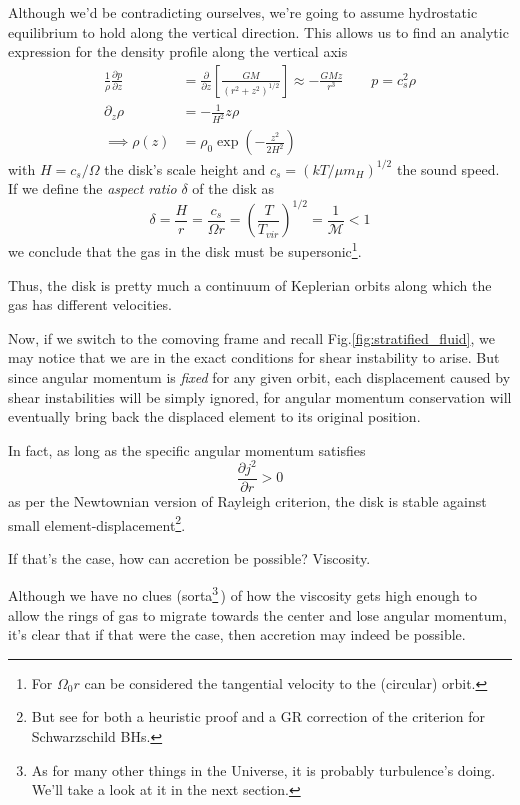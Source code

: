 \par Although we'd be contradicting ourselves, we're going to assume hydrostatic equilibrium to hold along the vertical direction. This allows us to find an analytic expression for the density profile along the vertical axis 
\begin{align*}
    \frac{1}{\rho}\frac{\partial p}{\partial z} &= \frac{\partial}{\partial z}\left[\frac{GM}{(r^{2}+z^{2})^{1/2}}\right]\approx -\frac{GMz}{r^{3}} \quad \quad p = c^{2}_{s}\rho\\
    \partial_{z}\rho &= -\frac{1}{H^{2}}z\rho\\
    \implies \rho(z) &= \rho_{0}\exp\left(-\frac{z^{2}}{2H^{2}}\right)
\end{align*}
with $H = c_{s}/\Omega$ the disk's scale height and $c_{s} = (kT/\mu m_{H})^{1/2}$ the sound speed. If we define the \emph{aspect ratio} $\delta$ of the disk as 
\begin{equation}
    \delta = \frac{H}{r} = \frac{c_{s}}{\Omega r} = \left(\frac{T}{T_{vir}}\right)^{1/2}= \frac{1}{\mathcal{M}} < 1
    \label{eq:aspect_ratio}
\end{equation}
we conclude that the gas in the disk must be supersonic\footnote{For $\Omega_{0}r$ can be considered the tangential velocity to the (circular) orbit.}.
\par Thus, the disk is pretty much a continuum of Keplerian orbits along which the gas has different velocities.
\par Now, if we switch to the comoving frame and recall Fig.\ref{fig:stratified_fluid}, we may notice that we are in the exact conditions for shear instability to arise. But since angular momentum is \emph{fixed} for any given orbit, each displacement caused by shear instabilities will be simply ignored, for angular momentum conservation will eventually bring back the displaced element to its original position.
\par In fact, as long as the specific angular momentum satisfies
\begin{equation*}
    \frac{\partial j^{2}}{\partial r} > 0
\end{equation*}
as per the Newtownian version of Rayleigh criterion, the disk is stable against small element-displacement\footnote{But see \cite{abramowicz2004rayleighsolbergcriteriareversal} for both a heuristic proof and a GR correction of the criterion for Schwarzschild BHs.}.
\par If that's the case, how can accretion be possible? Viscosity.
\par Although we have no clues (sorta\footnote{As for many other things in the Universe, it is probably turbulence's doing. We'll take a look at it in the next section.}\,) of how the viscosity gets high enough to allow the rings of gas to migrate towards the center and lose angular momentum, it's clear that if that were the case, then accretion may indeed be possible.
